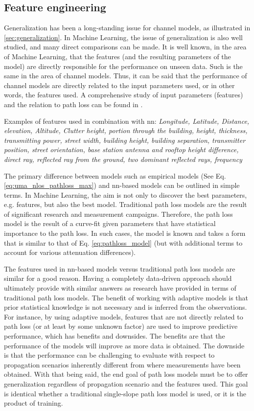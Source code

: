 \subsection{Feature engineering}

Generalization has been a long-standing issue for channel models, as illustrated in \ref{sec:generalization}. In Machine Learning, the issue of generalization is also well studied, and many direct comparisons can be made. It is well known, in the area of Machine Learning, that the features (and the resulting parameters of the model) are directly responsible for the performance on unseen data.  Such is the same in the area of channel models. Thus, it can be said that the performance of channel models are directly related to the input parameters used, or in other words, the features used. A comprehensive study of input parameters (features) and the relation to path loss can be found in \cite{Popoola2019}. 
 
Examples of features used in combination with \gls{nn}: \emph{Longitude, Latitude, Distance, elevation, Altitude, Clutter height, portion through the building, height, thickness, transmitting power, street width, building height, building separation, transmitter position, street orientation, base station antenna and rooftop height difference, direct ray, reflected ray from the ground, two dominant reflected rays, frequency}

The primary difference between models such as empirical models (See Eq. \ref{eq:uma_nlos_pathloss_max}) and \gls{nn}-based models can be outlined in simple terms. In Machine Learning, the aim is not only to discover the best parameters, e.g. features, but also the best model. Traditional path loss models are the result of significant research and measurement campaigns. Therefore, the path loss model is the result of a curve-fit given parameters that have statistical importance to the path loss. In such cases, the model is known and takes a form that is similar to that of Eq. \ref{eq:pathloss_model} (but with additional terms to account for various attenuation differences).

The features used in \gls{nn}-based models versus traditional path loss models are similar for a good reason. Having a completely data-driven approach should ultimately provide with similar answers as research have provided in terms of traditional path loss models. The benefit of working with adaptive models is that prior statistical knowledge is not necessary and is inferred from the observations. For instance, by using adaptive models, features that are not directly related to path loss (or at least by some unknown factor) are used to improve predictive performance, which has benefits and downsides. The benefits are that the performance of the models will improve as more data is obtained. The downside is that the performance can be challenging to evaluate with respect to propagation scenarios inherently different from where measurements have been obtained. With that being said, the end goal of path loss models must be to offer generalization regardless of propagation scenario and the features used. This goal is identical whether a traditional single-slope path loss model is used, or it is the product of training. 

